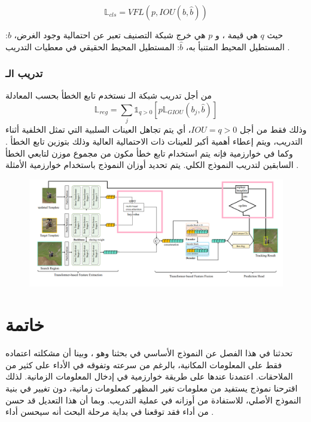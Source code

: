 \begin{equation} 
\mathbb{L}_{cls} = VFL(p,IOU(b,\hat{b}))
\label{eq:vlregress}
\end{equation}

حيث
$q$ 
هي قيمة
، و
$p$
هي خرج شبكة التصنيف تعبر عن احتمالية وجود الغرض، 
$b$:
المستطيل المحيط المتنبأ به،
$\hat{b}$:
المستطيل المحيط الحقيقي في معطيات التدريب
.
\newline
\subsubsection{تدريب الـ
}
من أجل تدريب شبكة الـ
نستخدم تابع الخطأ
بحسب المعادلة
\textLR{\ref{eq:giou}}
\begin{equation} 
\mathbb{L}_{reg} =\sum_{j} \mathds{1}_{q > 0} [p\mathbb{L}_{GIOU}(b_j,\hat{b})]
\label{eq:giou}
\end{equation}
وذلك فقط من أجل
$IOU=q>0$،
أي يتم تجاهل العينات السلبية التي تمثل الخلفية أثناء التدريب، ويتم إعطاء أهمية أكبر للعينات ذات الاحتمالية العالية
وذلك بتوزين تابع الخطأ 
.
\newline
وكما في خوارزمية 
فإنه يتم استخدام تابع خطأ مكون من مجموع موزن لتابعي الخطأ السابقين لتدريب النموذج الكلي.
يتم تحديد أوزان النموذج باستخدام خوارزمية الأمثلة
.
\begin{figure}[!h]
	\centerline{\includegraphics[width=\textwidth]{images/my_model}}
	\caption{}
	\label{fig:my_model}
\end{figure}
\section{خاتمة}
تحدثنا في هذا الفصل عن النموذج الأساسي في بحثنا وهو
،
وبينا أن مشكلته اعتماده فقط على المعلومات المكانية، بالرغم من سرعته وتفوقه في الأداء على كثير من الملاحقات.   اعتمدنا عندها على طريقة خوارزمية
في إدخال المعلومات الزمانية. لذلك اقترحنا نموذج يستفيد من معلومات تغير المظهر كمعلومات زمانية، دون تغيير في بنية النموذج الأصلي، للاستفادة من أوزانه في عملية التدريب. وبما أن هذا التعديل قد حسن من أداء 
فقد توقعنا في بداية مرحلة البحث أنه سيحسن أداء 
.
